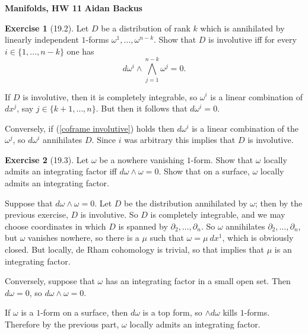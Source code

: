 \documentclass[10pt]{article}
\theoremstyle{definition}
\newtheorem{exer}{Exercise}
\begin{document}
\noindent
\large\textbf{Manifolds, HW 11} \hfill \textbf{Aidan Backus} \\


\begin{exer}[19.2]
Let $D$ be a distribution of rank $k$ which is annihilated by linearly independent $1$-forms $\omega^1, \dots, \omega^{n-k}$.
Show that $D$ is involutive iff for every $i \in \{1, \dots, n - k\}$ one has
\begin{equation}
\label{coframe involutive}
d\omega^i \wedge \bigwedge_{j=1}^{n-k} \omega^j = 0.
\end{equation}
\end{exer}

If $D$ is involutive, then it is completely integrable, so $\omega^i$ is a linear combination of $dx^j$, say $j \in \{k+1, \dots, n\}$.
But then it follows that $d\omega^i = 0$.

Conversely, if (\ref{coframe involutive}) holds then $d\omega^i$ is a linear combination of the $\omega^j$, so $d\omega^i$ annihilates $D$.
Since $i$ was arbitrary this implies that $D$ is involutive.

\begin{exer}[19.3]
Let $\omega$ be a nowhere vanishing $1$-form. Show that $\omega$ locally admits an integrating factor iff $d\omega \wedge \omega = 0$.
Show that on a surface, $\omega$ locally admits an integrating factor.
\end{exer}

Suppose that $d\omega \wedge \omega = 0$. Let $D$ be the distribution annihilated by $\omega$; then by the previous exercise, $D$ is involutive.
So $D$ is completely integrable, and we may choose coordinates in which $D$ is spanned by $\partial_2, \dots, \partial_n$.
So $\omega$ annihilates $\partial_2, \dots, \partial_n$, but $\omega$ vanishes nowhere, so there is a $\mu$ such that $\omega = \mu~dx^1$, which is obviously closed.
But locally, de Rham cohomology is trivial, so that implies that $\mu$ is an integrating factor.

Conversely, suppose that $\omega$ has an integrating factor in a small open set.
Then $d\omega = 0$, so $d\omega \wedge \omega = 0$.

If $\omega$ is a $1$-form on a surface, then $d\omega$ is a top form, so $\wedge d\omega$ kills $1$-forms. Therefore by the previous part, $\omega$ locally admits an integrating factor.
\end{document}
